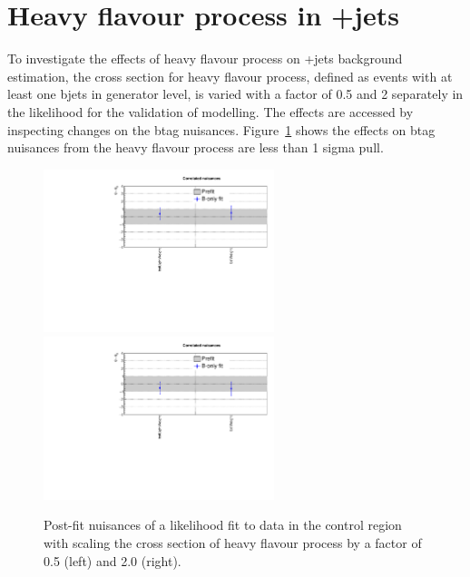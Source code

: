 
\section{Heavy flavour process in \znunu+jets}

To investigate the effects of heavy flavour process on \znunu+jets 
background estimation, the cross section for heavy flavour process, 
defined as events with at least one bjets in generator level, is varied 
with a factor of 0.5 and 2 separately in the likelihood for the 
validation of \nb modelling. The effects are accessed by inspecting 
changes on the btag nuisances. Figure~\ref{fig:zplusbb} shows the effects 
on btag nuisances from the heavy flavour process are less than 1 sigma pull.

\begin{figure}[h!]
  \centering
  \includegraphics[width=0.6\textwidth]{figures/ZPlusbb/TemplateFitv1_HFXs0p5}
  \includegraphics[width=0.6\textwidth]{figures/ZPlusbb/TemplateFitv1_HFXs2p0}
  \caption{\label{fig:btagsfge1b} Post-fit nuisances of a likelihood
    fit to data in the \mmj control region with scaling the cross section of heavy 
    flavour process by a factor of 0.5 (left) and 2.0 (right). }
  \label{fig:zplusbb}
\end{figure}

